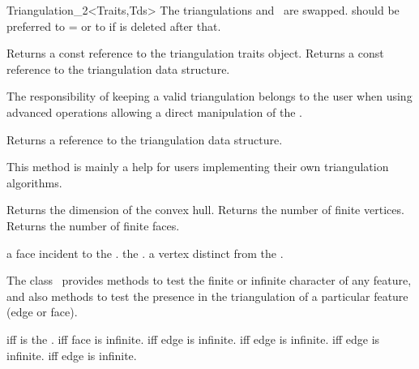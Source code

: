 \begin{ccRefClass}{Triangulation_2<Traits,Tds>}
{The triangulations  and \ccVar\ are swapped.
 should be preferred to  =  or to
 if  is deleted after that.}




\ccAccessFunctions
{}
{Returns a const reference to the triangulation traits object.}
\ccGlue
{}
{Returns a const reference to the triangulation data structure.}

\begin{ccAdvanced}
The responsibility of keeping a valid triangulation belongs to the user
when using advanced operations allowing a direct manipulation of the .

{Returns a reference to the triangulation data structure.}

This method is mainly a help for users implementing their own triangulation
algorithms.
 
\end{ccAdvanced}


\ccGlue
{}
{Returns the dimension of the convex hull.}
\ccGlue
{}
{Returns the number of finite vertices.}
\ccGlue
{}
{Returns the number of finite faces.}

{a  face incident to the .}
\ccGlue
{}
{the .}
\ccGlue
{}
{a vertex distinct from  the .}


\ccPredicates
The class \ccRefName\ provides methods to test
the finite or infinite character of any feature,
and also methods to test the presence in the triangulation
of a particular feature (edge or face).

{ iff  is the .}
\ccGlue
{}
{ iff face  is infinite.}
\ccGlue
{}
{ iff edge  is infinite.}
\ccGlue
{}
{ iff edge  is infinite.}
\ccGlue
{}
{ iff edge  is infinite.}
\ccGlue
{}
{ iff edge  is infinite.}



\end{ccRefClass}
